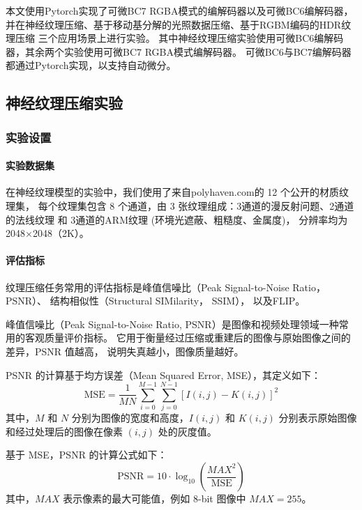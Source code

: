 本文使用Pytorch实现了可微BC7 RGBA模式的编解码器以及可微BC6编解码器，
并在神经纹理压缩、基于移动基分解的光照数据压缩、基于RGBM编码的HDR纹理压缩
三个应用场景上进行实验。
其中神经纹理压缩实验使用可微BC6编解码器，其余两个实验使用可微BC7 RGBA模式编解码器。
可微BC6与BC7编解码器都通过Pytorch实现，以支持自动微分。

\subsection{神经纹理压缩实验}

\subsubsection{实验设置}

\paragraph{实验数据集}

在神经纹理模型的实验中，我们使用了来自polyhaven.com\cite{PolyHaven}的 12 个公开的材质纹理集，
每个纹理集包含 8 个通道，由 3 张纹理组成：3通道的漫反射问题、2通道的法线纹理 和 3通道的ARM纹理 (环境光遮蔽、粗糙度、金属度)，
分辨率均为2048×2048（2K）。

\paragraph{评估指标}

纹理压缩任务常用的评估指标是峰值信噪比（Peak Signal-to-Noise Ratio，PSNR）、
结构相似性（Structural SIMilarity， SSIM）\cite{wang2004image}，
以及FLIP\cite{andersson2020flip}。

峰值信噪比（Peak Signal-to-Noise Ratio, PSNR）是图像和视频处理领域一种常用的客观质量评价指标。
它用于衡量经过压缩或重建后的图像与原始图像之间的差异，PSNR 值越高，
说明失真越小，图像质量越好。

PSNR 的计算基于均方误差（Mean Squared Error, MSE），其定义如下：
\begin{equation}
\text{MSE} = \frac{1}{MN} \sum_{i=0}^{M-1} \sum_{j=0}^{N-1} \left[ I(i,j) - K(i,j) \right]^2
\end{equation}
其中，$M$ 和 $N$ 分别为图像的宽度和高度，$I(i,j)$ 和 $K(i,j)$ 分别表示原始图像和经过处理后的图像在像素 $(i,j)$ 处的灰度值。

基于 MSE，PSNR 的计算公式如下：
\begin{equation}
    \text{PSNR} = 10 \cdot \log_{10} \left( \frac{MAX^2}{\text{MSE}} \right)
\end{equation}
其中，$MAX$ 表示像素的最大可能值，例如 8-bit 图像中 $MAX = 255$。

